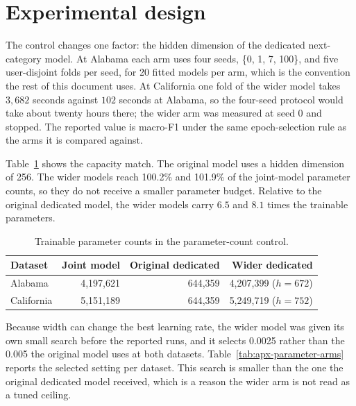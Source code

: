 \section{Experimental design}
\label{sec:apx-parameter-design}

The control changes one factor: the hidden dimension of the dedicated
next-category model. At Alabama each arm uses four seeds, \{0, 1, 7, 100\}, and five
user-disjoint folds per seed, for 20 fitted models per arm, which is the convention the rest of
this document uses. At California one fold of the wider model takes $3{,}682$ seconds against
$102$ seconds at Alabama, so the four-seed protocol would take about twenty hours there; the
wider arm was measured at seed 0 and stopped. The reported value is macro-F1 under the same
epoch-selection rule as the arms it is compared against.

Table~\ref{tab:apx-parameter-counts} shows the capacity match. The original model
uses a hidden dimension of 256. The wider models reach 100.2\% and 101.9\% of the
joint-model parameter counts, so they do not receive a smaller parameter budget. Relative to the
original dedicated model, the wider models carry $6.5$ and $8.1$ times the trainable parameters.

\begin{table}[H]
    \centering
    \caption{Trainable parameter counts in the parameter-count control.}
    \label{tab:apx-parameter-counts}
    \begin{tabular}{lrrr}
        \toprule
        Dataset & Joint model & Original dedicated & Wider dedicated \\
        \midrule
        Alabama    & 4,197,621 & 644,359 & 4,207,399 ($h=672$) \\
        California & 5,151,189 & 644,359 & 5,249,719 ($h=752$) \\
        \bottomrule
    \end{tabular}
\end{table}

Because width can change the best learning rate, the wider model was given its own small search
before the reported runs, and it selects 0.0025 rather than the 0.005 the original model uses at
both datasets. Table~\ref{tab:apx-parameter-arms} reports the selected setting per dataset. This
search is smaller than the one the original dedicated model received, which is a reason the wider
arm is not read as a tuned ceiling.

